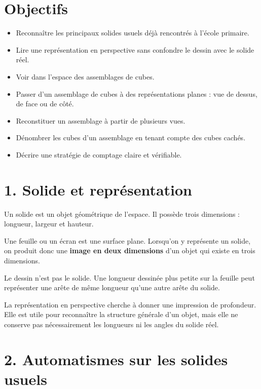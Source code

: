 
\section{Objectifs}

\begin{itemize}
\item Reconnaître les principaux solides usuels déjà rencontrés à l'école primaire.
\item Lire une représentation en perspective sans confondre le dessin avec le solide réel.
\item Voir dans l'espace des assemblages de cubes.
\item Passer d'un assemblage de cubes à des représentations planes : vue de dessus, de face ou de côté.
\item Reconstituer un assemblage à partir de plusieurs vues.
\item Dénombrer les cubes d'un assemblage en tenant compte des cubes cachés.
\item Décrire une stratégie de comptage claire et vérifiable.
\end{itemize}

\section{1. Solide et représentation}

Un solide est un objet géométrique de l'espace. Il possède trois dimensions : longueur, largeur et hauteur.

Une feuille ou un écran est une surface plane. Lorsqu'on y représente un solide, on produit donc une \textbf{image en deux dimensions} d'un objet qui existe en trois dimensions.

\begin{attention}
Le dessin n'est pas le solide. Une longueur dessinée plus petite sur la feuille peut représenter une arête de même longueur qu'une autre arête du solide.
\end{attention}

La représentation en perspective cherche à donner une impression de profondeur. Elle est utile pour reconnaître la structure générale d'un objet, mais elle ne conserve pas nécessairement les longueurs ni les angles du solide réel.

\section{2. Automatismes sur les solides usuels}

